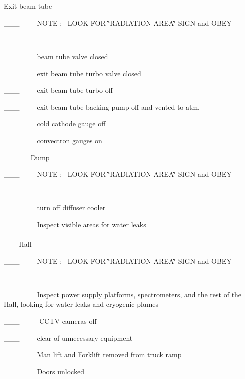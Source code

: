 ~

~~~~~~~~~~~~~~~~

Exit beam tube

\_\_\_~~~~~NOTE :~ LOOK FOR \char`\"{}RADIATION AREA\char`\"{} SIGN and OBEY

~

\_\_\_~~~~~beam tube valve closed 

\_\_\_~~~~~exit beam tube turbo valve closed

\_\_\_~~~~~exit beam tube turbo off 

\_\_\_~~~~~exit beam tube backing pump off and vented to atm.

\_\_\_~~~~~cold cathode gauge off

\_\_\_~~~~~convectron gauges on

~
~
~
~
~Dump

\_\_\_~~~~~NOTE :~ LOOK FOR \char`\"{}RADIATION AREA\char`\"{} SIGN and OBEY

~

\_\_\_~~~~~turn off diffuser cooler

\_\_\_~~~~~Inspect visible areas for water leaks
\\
\\
~
~
~Hall 

\_\_\_~~~~~NOTE :~ LOOK FOR \char`\"{}RADIATION AREA\char`\"{} SIGN and OBEY

~

\_\_\_~~~~~Inspect power supply platforms, spectrometers, and the rest of the
Hall, looking for water leaks and cryogenic plumes

\_\_\_~~~~~ CCTV cameras off

\_\_\_~~~~~clear of unnecessary equipment

\_\_\_~~~~~Man lift and Forklift removed from truck ramp

\_\_\_~~~~~Doors unlocked

~

~

